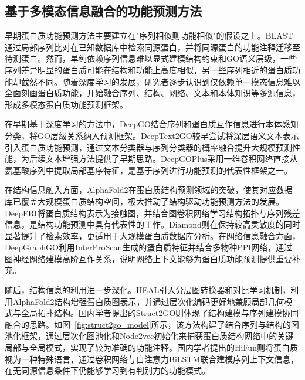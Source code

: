 \subsection{基于多模态信息融合的功能预测方法}

早期蛋白质功能预测方法主要建立在"序列相似则功能相似"的假设之上。BLAST\cite{altschul1990basic}通过局部序列比对在已知数据库中检索同源蛋白，并将同源蛋白的功能注释迁移至待测蛋白。然而，单纯依赖序列信息难以显式建模结构约束和GO语义层级，一些序列差异明显的蛋白质可能在结构和功能上高度相似，另一些序列相近的蛋白质功能却截然不同。随着深度学习的发展，研究者逐步认识到仅依赖单一模态信息难以全面刻画蛋白质功能，开始融合序列、结构、网络、文本和本体知识等多源信息，形成多模态蛋白质功能预测框架。

在早期基于深度学习的方法中，DeepGO\cite{kulmanov2018deepgo}结合序列和蛋白质互作信息进行本体感知分类，将GO层级关系纳入预测框架。DeepText2GO\cite{you2018deeptext2go}较早尝试将深层语义文本表示引入蛋白质功能预测，通过文本分类器与序列分类器的概率融合提升大规模预测性能，为后续文本增强方法提供了早期思路。DeepGOPlus\cite{kulmanov2020deepgoplus}采用一维卷积网络直接从氨基酸序列中提取局部基序特征，是基于序列进行功能预测的代表性框架之一。

在结构信息融入方面，AlphaFold2\cite{jumper2021highly}在蛋白质结构预测领域的突破，使其对应数据库已覆盖大规模蛋白质结构空间\cite{varadi2022alphafold}，极大推动了结构驱动功能预测方法的发展。DeepFRI\cite{gligorijevic2021structure}将蛋白质结构表示为接触图，并结合图卷积网络学习结构拓扑与序列残差信息，是结构功能预测中具有代表性的工作。Diamond\cite{diamond}则在保持较高灵敏度的同时显著提升了检索效率，更适用于大规模蛋白质数据库分析。在网络信息融合方面，DeepGraphGO\cite{you2021deepgraphgo}利用InterProScan\cite{jones2014interproscan}生成的蛋白质特征并结合多物种PPI网络，通过图神经网络建模高阶互作关系，说明网络上下文能够为蛋白质功能预测提供重要补充。

随后，结构信息的利用进一步深化。HEAL\cite{gu2023hierarchical}引入分层图转换器和对比学习机制，利用AlphaFold2结构增强蛋白质图表示，并通过层次化编码更好地兼顾局部几何模式与全局拓扑结构。国内学者提出的Struct2GO\cite{jiao2023struct2go}则体现了结构建模与序列建模协同融合的思路。如图~\ref{fig:struct2go_model}所示，该方法构建了结合序列与结构的图池化框架，通过层次化图池化和Node2vec\cite{grover2016node2vec}初始化来捕获蛋白质结构网络中的关键局部与全局模式，实现了较为准确的功能注释。国内学者提出的HiFun\cite{wu2023hifun}则将蛋白质视为一种特殊语言，通过卷积网络与自注意力BiLSTM联合建模序列上下文信息，在无同源信息条件下仍能够学习到有判别力的功能模式。

